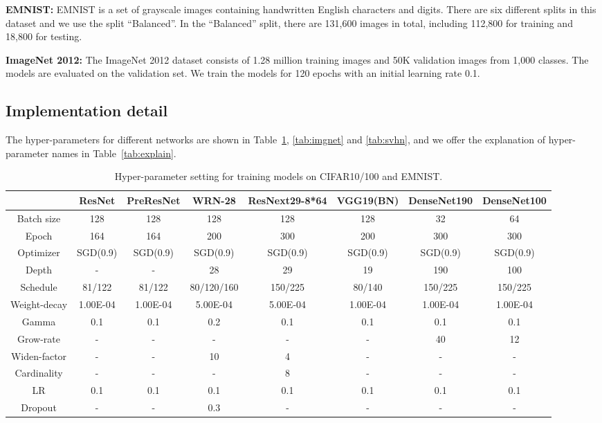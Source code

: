 \documentclass[11pt]{article}
\begin{document}
\textbf{EMNIST:} EMNIST is a set of  grayscale images containing handwritten English characters and digits. There are six different splits in this dataset and we use the split ``Balanced''. In the ``Balanced'' split, there are 131,600 images in total, including 112,800 for training and 18,800 for testing.


\textbf{ImageNet 2012:} The ImageNet 2012 dataset consists of 1.28 million training images and 50K validation images from 1,000 classes. The models are evaluated on the validation set. We train the models for 120 epochs with an initial learning rate 0.1.
\subsection{Implementation detail}
The hyper-parameters for different networks are shown in Table~\ref{tab:cifar-params}, \ref{tab:imgnet} and \ref{tab:svhn}, and we offer the explanation of hyper-parameter names in Table~\ref{tab:explain}.
\begin{table}[htbp]
\scriptsize
  \centering
    \begin{tabular}{|c|c|c|c|c|c|c|c|}
    \toprule
          & ResNet & PreResNet & WRN-28 & ResNext29-8*64 & VGG19(BN) & DenseNet190 & DenseNet100 \\
    \midrule
    Batch size & 128   & 128   & 128   & 128   & 128   & 32    & 64 \\
    Epoch & 164   & 164   & 200   & 300   & 200   & 300   & 300 \\
    Optimizer & SGD(0.9) & SGD(0.9) & SGD(0.9) & SGD(0.9) & SGD(0.9) & SGD(0.9) & SGD(0.9) \\
    Depth & -     & -     & 28    & 29    & 19    & 190   & 100 \\
    Schedule & 81/122 & 81/122 & 80/120/160 & 150/225 & 80/140 & 150/225 & 150/225 \\
    Weight-decay & 1.00E-04 & 1.00E-04 & 5.00E-04 & 5.00E-04 & 1.00E-04 & 1.00E-04 & 1.00E-04 \\
    Gamma & 0.1   & 0.1   & 0.2   & 0.1   & 0.1   & 0.1   & 0.1 \\
    Grow-rate & -     & -     & -     & -     & -     & 40    & 12 \\
    Widen-factor & -     & -     & 10    & 4     & -     & -     & - \\
    Cardinality & -     & -     & -     & 8     & -     & -     & - \\
    LR    & 0.1   & 0.1   & 0.1   & 0.1   & 0.1   & 0.1   & 0.1 \\
    Dropout & -     & -     & 0.3   & -     & -     & -     & - \\
    \bottomrule
    \end{tabular}\caption{Hyper-parameter setting for training models on CIFAR10/100 and EMNIST.}
  \label{tab:cifar-params}\end{table}
\end{document}
